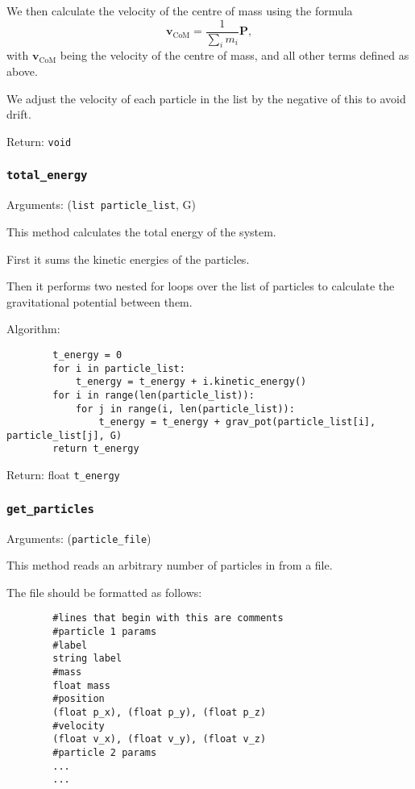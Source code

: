 \documentclass[a4paper, 11pt, british, left=1in, right=1in, top=0.3in, bottom=1in]{article}
\begin{document}
	We then calculate the velocity of the centre of mass using the formula $$\textbf{v}_{\text{CoM}} = \frac{1}{\sum_{i}^{}m_i}\textbf{P},$$ with $\textbf{v}_{\text{CoM}}$ being the velocity of the centre of mass, and all other terms defined as above. 
	
	We adjust the velocity of each particle in the list by the negative of this to avoid drift. 
	
	Return: \texttt{void}
	
	\subsubsection{\texttt{total\_energy}}
	
	Arguments: (\texttt{list particle\_list}, G)
	
	This method calculates the total energy of the system. 
	
	First it sums the kinetic energies of the particles. 
	
	Then it performs two nested for loops over the list of particles to calculate the gravitational potential between them.
	
	Algorithm:
	
	\begin{verbatim}
		t_energy = 0
		for i in particle_list:
		    t_energy = t_energy + i.kinetic_energy()
		for i in range(len(particle_list)):
		    for j in range(i, len(particle_list)):
		        t_energy = t_energy + grav_pot(particle_list[i], particle_list[j], G)
		return t_energy
	\end{verbatim}
	
	Return: float \texttt{t\_energy}
	
	\subsubsection{\texttt{get\_particles}}
	
	Arguments: (\texttt{particle\_file})
	
	This method reads an arbitrary number of particles in from a file. 
	
	The file should be formatted as follows:
	
	\begin{verbatim}
		#lines that begin with this are comments
		#particle 1 params
		#label
		string label
		#mass
		float mass
		#position
		(float p_x), (float p_y), (float p_z)
		#velocity
		(float v_x), (float v_y), (float v_z)
		#particle 2 params
		...
		...
	\end{verbatim}
	
\end{document}
